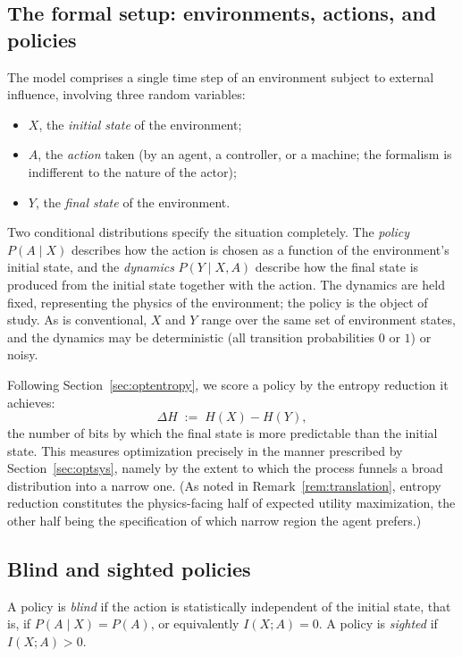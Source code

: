 \documentclass[11pt]{article}
\begin{document}
\subsection{The formal setup: environments, actions, and policies}
\label{sec:tlsetup}

The model comprises a single time step of an environment subject to external influence, involving three random variables:

\begin{itemize}[leftmargin=2em]
  \item $X$, the \emph{initial state} of the environment;
  \item $A$, the \emph{action} taken (by an agent, a controller, or a machine; the formalism is indifferent to the nature of the actor);
  \item $Y$, the \emph{final state} of the environment.
\end{itemize}

Two conditional distributions specify the situation completely. The \emph{policy} $P(A \mid X)$ describes how the action is chosen as a function of the environment's initial state, and the \emph{dynamics} $P(Y \mid X, A)$ describe how the final state is produced from the initial state together with the action. The dynamics are held fixed, representing the physics of the environment; the policy is the object of study. As is conventional, $X$ and $Y$ range over the same set of environment states, and the dynamics may be deterministic (all transition probabilities $0$ or $1$) or noisy.

Following Section~\ref{sec:optentropy}, we score a policy by the entropy reduction it achieves:
\[
\Delta H \;:=\; H(X) - H(Y),
\]
the number of bits by which the final state is more predictable than the initial state. This measures optimization precisely in the manner prescribed by Section~\ref{sec:optsys}, namely by the extent to which the process funnels a broad distribution into a narrow one. (As noted in Remark~\ref{rem:translation}, entropy reduction constitutes the physics-facing half of expected utility maximization, the other half being the specification of which narrow region the agent prefers.)

\subsection{Blind and sighted policies}
\label{sec:blindsighted}

\begin{definition}
\label{def:blind}
A policy is \emph{blind} if the action is statistically independent of the initial state, that is, if $P(A \mid X) = P(A)$, or equivalently $I(X; A) = 0$. A policy is \emph{sighted} if $I(X; A) > 0$.
\end{definition}
\end{document}
